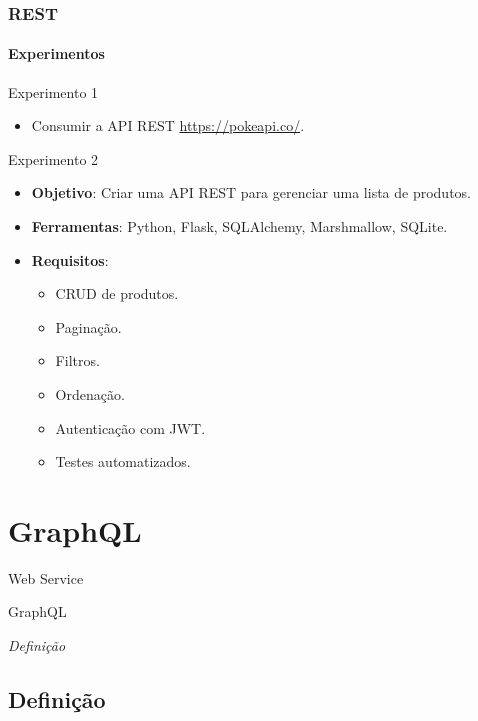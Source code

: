 \documentclass[
	9pt, %
	t, %
]{beamer}
\begin{document}
\begin{frame}
	\frametitle{REST}
	\framesubtitle{Experimentos}

	\begin{block}{Experimento 1}
		\begin{itemize}
			\item Consumir a API REST \href{https://pokeapi.co/}{https://pokeapi.co/}.
		\end{itemize}
	\end{block}

	\begin{block}{Experimento 2}
		\begin{itemize}
			\item \textbf{Objetivo}: Criar uma API REST para gerenciar uma lista de produtos.
			\item \textbf{Ferramentas}: Python, Flask, SQLAlchemy, Marshmallow, SQLite.
			\item \textbf{Requisitos}:
			\begin{itemize}
				\item CRUD de produtos.
				\item Paginação.
				\item Filtros.
				\item Ordenação.
				\item Autenticação com JWT.
				\item Testes automatizados.
			\end{itemize}
		\end{itemize}
	\end{block}

\end{frame}

\section{GraphQL}

\begin{frame}
	\begin{center}
		
		\bigskip\bigskip\bigskip\bigskip %
		{\Large Web Service}
		
		\bigskip\bigskip %
		{\Huge GraphQL}
		
		\smallskip
		{\small \textit{Definição}}
	\end{center}

\end{frame}

\subsection{Definição}
\end{document}
